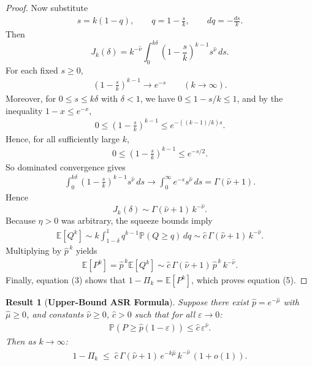 \documentclass{article}
\newtheorem{theorem}{Result}
\theoremstyle{remark} %
\begin{document}
\begin{proof}
Now substitute
\begin{align}
s = k(1-q),\qquad q = 1-\frac{s}{k},\qquad dq = -\frac{ds}{k}.
\end{align}
Then
\begin{equation}
J_k(\delta)=k^{-\hat{\nu}}\int_0^{k\delta}\left(1-\frac{s}{k}\right)^{k-1} s^{\hat{\nu}}\,ds. 
\end{equation}
For each fixed $s\ge 0$,
\begin{align}
\left(1-\frac{s}{k}\right)^{k-1}\to e^{-s}\qquad (k\to\infty).
\end{align}
Moreover, for $0\le s\le k\delta$ with $\delta<1$, we have $0\le 1-s/k\le 1$, and by the inequality $1-x\le e^{-x}$,
\begin{align}
0\le \left(1-\frac{s}{k}\right)^{k-1}
\le e^{-((k-1)/k)s}.
\end{align}
Hence, for all sufficiently large $k$,
\begin{align}
0\le \left(1-\frac{s}{k}\right)^{k-1}\le e^{-s/2}.
\end{align}
So dominated convergence gives
\begin{align}
\int_0^{k\delta}\left(1-\frac{s}{k}\right)^{k-1} s^{\hat{\nu}}\,ds
\to
\int_0^\infty e^{-s}s^{\hat{\nu}}\,ds
=
\Gamma(\hat{\nu}+1).
\end{align}
Hence
\begin{equation}
J_k(\delta)\sim \Gamma(\hat{\nu}+1)\,k^{-\hat{\nu}}. 
\end{equation}
Because $\eta>0$ was arbitrary, the squeeze bounds imply
\begin{align}
\mathbb{E}[Q^k]\sim k\int_{1-\delta}^{1} q^{k-1}\mathbb{P}(Q\ge q)\,dq \sim \hat{c}\,\Gamma(\hat{\nu}+1)\,k^{-\hat{\nu}}.
\end{align}
Multiplying by $\hat{p}^{\,k}$ yields
\begin{align}
\mathbb{E}[P^k]=\hat{p}^{\,k}\mathbb{E}[Q^k]\sim \hat{c}\,\Gamma(\hat{\nu}+1)\,\hat{p}^{\,k}\,k^{-\hat{\nu}}.
\end{align}
Finally, equation (3) shows that $1-\Pi_k=\mathbb{E}[P^k]$, which proves equation (5).
\end{proof}

\begin{theorem}[\textbf{Upper-Bound ASR Formula}]
\label{prop:upper_bound_moment_app}
Suppose there exist $\hat{p}=e^{-\hat{\mu}}$ with $\hat{\mu}\ge 0$, 
and constants $\hat{\nu}\ge 0$, $\hat{c}>0$ such that 
for all $\varepsilon \to 0$:
\begin{align}
\mathbb{P}(P \ge \hat{p}(1-\varepsilon)) \le \hat{c}\,\varepsilon^{\hat{\nu}}.
\end{align}
Then as $k\to\infty$:
\begin{align}
1-\Pi_k \;\le\; \hat{c}\,\Gamma(\hat{\nu}+1)\,e^{-k\hat{\mu}}\,k^{-\hat{\nu}}\,(1+o(1)).
\end{align}
\end{theorem}
\end{document}
